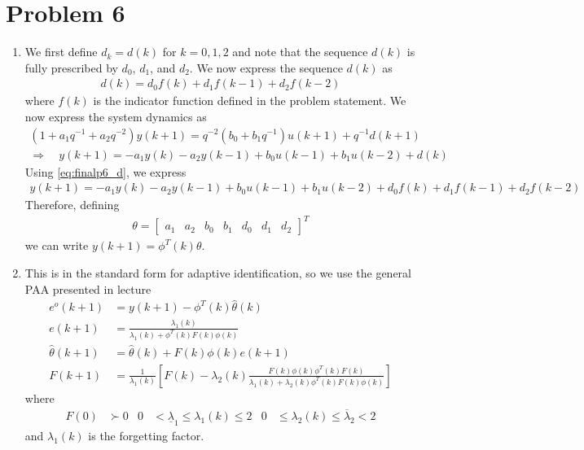 \section*{Problem 6}

\begin{enumerate}
    \item
    We first define $d_k = d(k)$ for $k=0,1,2$ and note that the sequence $d(k)$ is fully prescribed by $d_0$, $d_1$, and $d_2$. We now express the sequence $d(k)$ as
    \begin{align*}
        d(k) = d_0 f(k) + d_1 f(k-1) + d_2 f(k-2)
            \label{eq:finalp6_d}
    \end{align*}
    where $f(k)$ is the indicator function defined in the problem statement. We now express the system dynamics as
    \begin{gather*}
        (1 + a_1 q^{-1} + a_2 q^{-2}) y(k+1) = q^{-2} (b_0 + b_1 q^{-1}) u(k+1) + q^{-1} d(k+1) \\
        \Rightarrow \quad y(k+1) = -a_1 y(k) - a_2 y(k-1) + b_0 u(k-1) + b_1 u(k-2) + d(k)
    \end{gather*}
    Using \eqref{eq:finalp6_d}, we express
    \begin{align*}
        y(k+1) = -a_1 y(k) - a_2 y(k-1) + b_0 u(k-1) + b_1 u(k-2) + d_0 f(k) + d_1 f(k-1) + d_2 f(k-2)
    \end{align*}
    Therefore, defining
    \begin{align*}
        \theta = \begin{bmatrix}
                a_1 & a_2 & b_0 & b_1 & d_0 & d_1 & d_2
            \end{bmatrix}^T
    \end{align*}
    we can write $y(k+1) = \phi^T(k) \theta$.
    
    \item
    This is in the standard form for adaptive identification, so we use the general PAA presented in lecture
    \begin{align*}
        e^o(k+1) & = y(k+1) - \phi^T(k) \hat{\theta}(k) \\
        e(k+1) & = \frac{ \lambda_1(k) }{ \lambda_1(k) + \phi^T(k) F(k) \phi(k) } \\
        \hat{\theta}(k+1) & = \hat{\theta}(k) + F(k) \phi(k) e(k+1) \\
        F(k+1) & = \frac{1}{\lambda_1(k)} \left[ F(k) 
            - \lambda_2(k) \frac{ F(k) \phi(k) \phi^T(k) F(k) }
            { \lambda_1(k) + \lambda_2(k) \phi^T(k) F(k) \phi(k) } \right]
    \end{align*}
    where
    \begin{align*}
        F(0) & \succ 0
            & 0 & < \underline{\lambda}_1 \leq \lambda_1(k) \leq 2
            & 0 & \leq \lambda_2(k) \leq \overline{\lambda}_2 < 2
    \end{align*}
    and $\lambda_1(k)$ is the forgetting factor.
    

\end{enumerate}
